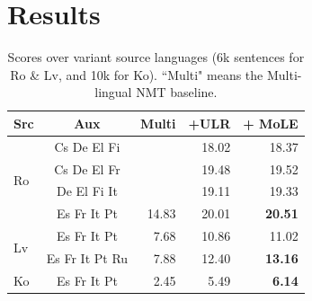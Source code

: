 \section{Results}

\begin{table}[t]
\centering
\begin{tabular}{l|c|rrr}
Src & Aux   & Multi & +ULR & + MoLE \\ \hline
\multirow{ 4}{*}{Ro}     
& Cs De El Fi & & 18.02 & 18.37   \\
& Cs De El Fr & & 19.48 &  19.52  \\
& De El Fi It & & 19.11 & 19.33   \\
& Es Fr It Pt & 14.83   & 20.01   &  \textbf{20.51} \\ \hline
\multirow{ 2}{*}{Lv}      
& Es Fr It Pt & 7.68     & 10.86     &  11.02 \\ 
& Es Fr It Pt Ru & 7.88     & 12.40     &  \textbf{13.16} \\  \hline
Ko    & Es Fr It Pt  & 2.45    & 5.49    & \textbf{6.14}  \\     
\end{tabular}
\caption{\label{table.bleu} Scores over variant source languages (6k sentences for Ro \& Lv, and 10k for Ko). ``Multi" means the Multi-lingual NMT baseline.}
\end{table}


